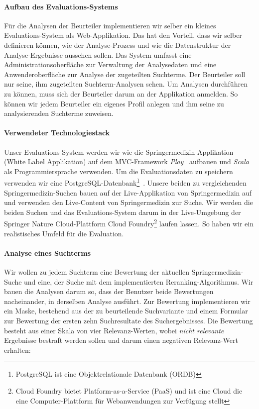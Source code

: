 \paragraph{Aufbau des Evaluations-Systems}
Für die Analysen der Beurteiler implementieren wir selber ein kleines Evaluations-System als Web-Applikation. Das hat den Vorteil, dass wir selber definieren können, wie der Analyse-Prozess und wie die Datenstruktur der Analyse-Ergebnisse aussehen sollen. Das System umfasst eine Administrationsoberfläche zur Verwaltung der Analysedaten und eine Anwenderoberfläche zur Analyse der zugeteilten Suchterme. Der Beurteiler soll nur seine, ihm zugeteilten Suchterm-Analysen sehen. Um Analysen durchführen zu können, muss sich der Beurteiler darum an der Applikation anmelden. So können wir jedem Beurteiler ein eigenes Profil anlegen und ihm seine zu analysierenden Suchterme zuweisen. 

\paragraph{Verwendeter Technologiestack} 
Unser Evaluations-System werden wir wie die Springermedizin-Applikation (White Label Applikation) auf dem MVC-Framework \textit{Play}~\cite{Play} aufbauen und \textit{Scala}~\cite{Scala} als Programmiersprache verwenden. Um die Evaluationsdaten zu speichern verwenden wir eine PostgreSQL-Datenbank\footnote{PostgreSQL ist eine Objektrelationale Datenbank (ORDB)}~\cite{Postgresql}. Unsere beiden zu vergleichenden Springermedizin-Suchen bauen auf der Live-Applikation von Springermedizin auf und verwenden den Live-Content von Springermedizin zur Suche. Wir werden die beiden Suchen und das Evaluations-System darum in der Live-Umgebung der Springer Nature Cloud-Plattform Cloud Foundry\footnote{Cloud Foundry bietet Platform-as-a-Service  (PaaS) und ist eine Cloud die eine Computer-Plattform für Webanwendungen zur Verfügung stellt} laufen lassen. So haben wir ein realistisches Umfeld für die Evaluation. 

\paragraph{Analyse eines Suchterms}
Wir wollen zu jedem Suchterm eine Bewertung der aktuellen Springermedizin-Suche und eine, der Suche mit dem implementierten Reranking-Algorithmus. Wir bauen die Analysen darum so, dass der Benutzer beide Bewertungen nacheinander, in derselben Analyse ausführt. Zur Bewertung implementieren wir ein Maske, bestehend aus der zu beurteilende Suchvariante und einem Formular zur Bewertung der ersten zehn Suchresultate des Suchergebnisses. Die Bewertung besteht aus einer Skala von vier Relevanz-Werten, wobei \textit{nicht relevante} Ergebnisse bestraft werden sollen und darum einen negativen Relevanz-Wert erhalten:


